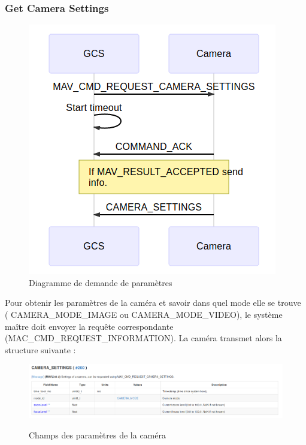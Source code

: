 \subsubsection{Get Camera Settings}
\begin{figure}[h]
    \centering
    \includegraphics[scale=0.45]{img/camera_settings.png}
    \caption{Diagramme de demande de paramètres}
    \label{fig:CameraCmdsettings}
\end{figure}

Pour obtenir les paramètres de la caméra et savoir dans quel mode elle se trouve ( CAMERA\_MODE\_IMAGE ou CAMERA\_MODE\_VIDEO), le système maître doit envoyer la requête correspondante (MAC\_CMD\_REQUEST\_INFORMATION). La caméra transmet alors la structure suivante :

\begin{figure}[ht]
    \hspace{-2cm}
    {
        \includegraphics[scale=0.39]{img/settings_struct.png}
    }
    \caption{Champs des paramètres de la caméra}
    \label{fig:CameraCmdsetstruct}
\end{figure}
\newpage
